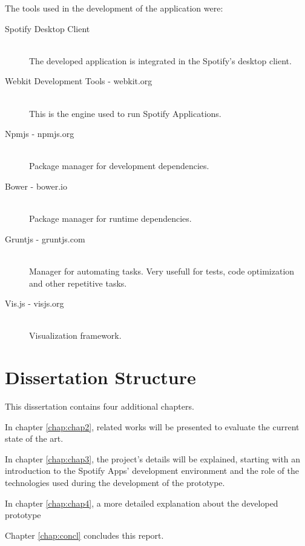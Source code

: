 The tools used in the development of the application were:

\begin{description}
  \item[Spotify Desktop Client] \hfill \\
    The developed application is integrated in the Spotify's desktop client.
  \item[Webkit Development Tools - webkit.org] \hfill \\
    This is the engine used to run Spotify Applications.
  \item[Npmjs - npmjs.org] \hfill \\
    Package manager for development dependencies.
  \item[Bower - bower.io] \hfill \\
    Package manager for runtime dependencies.
  \item[Gruntjs - gruntjs.com] \hfill \\
    Manager for automating tasks. Very usefull for tests, code optimization and other repetitive tasks.
  \item[Vis.js - visjs.org] \hfill \\
    Visualization framework.
\end{description}


\section{Dissertation Structure} \label{sec:struct}

This dissertation contains four additional chapters.

In chapter \ref{chap:chap2}, related works will be presented to evaluate the current state of the art.

In chapter \ref{chap:chap3}, the project's details will be explained, starting with an introduction to the Spotify Apps' development environment and the role of the technologies used during the development of the prototype.

In chapter \ref{chap:chap4}, a more detailed explanation about the developed prototype

Chapter \ref{chap:concl} concludes this report.
